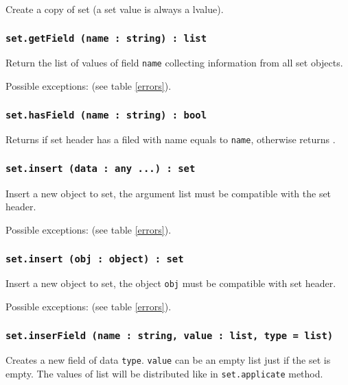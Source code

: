 Create a copy of set (a set value is always a lvalue).

\subsubsection{\texttt{set.getField (name : string) : list}}

Return the list of values of field \texttt{name} collecting information from all set objects.

Possible exceptions:  (see table \ref{errors}).

\subsubsection{\texttt{set.hasField (name : string) : bool}}

Returns \true{} if set header has a filed with name equals to \texttt{name}, otherwise returns \false.

\subsubsection{\texttt{set.insert (data : any ...) : set}}

Insert a new object to set, the argument list must be compatible with the set header.

Possible exceptions:  (see table \ref{errors}).

\subsubsection{\texttt{set.insert (obj : object) : set}}

Insert a new object to set, the object \texttt{obj} must be compatible with set header.

Possible exceptions:  (see table \ref{errors}).

\subsubsection{\texttt{set.inserField (name : string, value : list, type = list)}}

Creates a new field of data \texttt{type}. \texttt{value} can be an empty list just if the set is empty. The values of list will be distributed like in \texttt{set.applicate} method.

